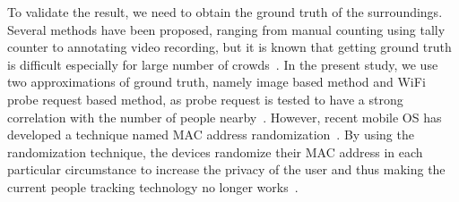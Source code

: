 To validate the result, we need to obtain the ground truth of the surroundings. Several methods have been proposed, ranging from manual counting using tally  counter to annotating video recording, but it is known that getting ground truth is difficult especially for large number of crowds~\cite{thesis006}. In the present study, we use two approximations of ground truth, namely image based method and WiFi probe request based method, as probe request is tested to have a strong correlation with the number of people nearby~\cite{thesis047}. However, recent mobile \ac{OS} has developed a technique named \ac{MAC} address randomization~\cite{thesis062,thesis061}. By using the randomization technique, the devices randomize their \ac{MAC} address in each particular circumstance to increase the privacy of the user and thus making the current people tracking technology no longer works~\cite{thesis079}.



